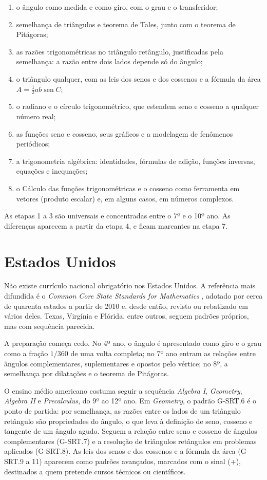 \documentclass[
    article,
    12pt,
    a4paper,
    sumario=tradicional
]{abntex2}
\begin{document}
\begin{enumerate}
\item o ângulo como medida e como giro, com o grau e o transferidor;
\item semelhança de triângulos e teorema de Tales, junto com o teorema de
Pitágoras;
\item as razões trigonométricas no triângulo retângulo, justificadas pela
semelhança: a razão entre dois lados depende só do ângulo;
\item o triângulo qualquer, com as leis dos senos e dos cossenos e a fórmula
da área $A = \tfrac12 ab \operatorname{sen}C$;
\item o radiano e o círculo trigonométrico, que estendem seno e cosseno a
qualquer número real;
\item as funções seno e cosseno, seus gráficos e a modelagem de fenômenos
periódicos;
\item a trigonometria algébrica: identidades, fórmulas de adição, funções
inversas, equações e inequações;
\item o Cálculo das funções trigonométricas e o cosseno como ferramenta em
vetores (produto escalar) e, em alguns casos, em números complexos.
\end{enumerate}

As etapas 1 a 3 são universais e concentradas entre o 7º e o 10º ano. As
diferenças aparecem a partir da etapa 4, e ficam marcantes na etapa 7.

\section{Estados Unidos}

Não existe currículo nacional obrigatório nos Estados Unidos. A referência
mais difundida é o \textit{Common Core State Standards for Mathematics}
\cite{ccss2010}, adotado por cerca de quarenta estados a partir de 2010 e, desde
então, revisto ou rebatizado em vários deles. Texas, Virgínia e Flórida, entre
outros, seguem padrões próprios, mas com sequência parecida.

A preparação começa cedo. No 4º ano, o ângulo é apresentado como giro e o grau
como a fração $1/360$ de uma volta completa; no 7º ano entram as relações entre
ângulos complementares, suplementares e opostos pelo vértice; no 8º, a
semelhança por dilatações e o teorema de Pitágoras.

O ensino médio americano costuma seguir a sequência \textit{Algebra I},
\textit{Geometry}, \textit{Algebra II} e \textit{Precalculus}, do 9º ao 12º ano. Em
\textit{Geometry}, o padrão G-SRT.6 é o ponto de partida: por semelhança, as
razões entre os lados de um triângulo retângulo são propriedades do ângulo, o
que leva à definição de seno, cosseno e tangente de um ângulo agudo. Seguem a
relação entre seno e cosseno de ângulos complementares (G-SRT.7) e a resolução
de triângulos retângulos em problemas aplicados (G-SRT.8). As leis dos senos e
dos cossenos e a fórmula da área (G-SRT.9 a 11) aparecem como padrões
avançados, marcados com o sinal (+), destinados a quem pretende cursos
técnicos ou científicos.
\end{document}
